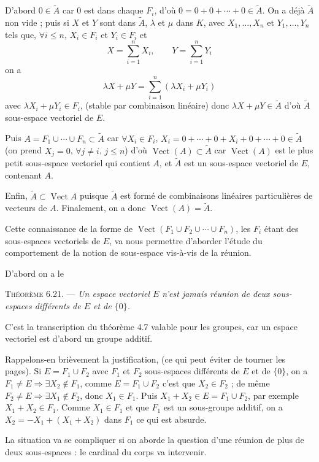 D'abord $0\in\widetilde A$ car 0 est dans chaque $F_i$, d'où $0=0+0+\cdots+0\in\widetilde A$. On a déjà $\widetilde A$ non vide ; puis si $X$ et $Y$ sont dans $\widetilde A$, $\lambda$ et $\mu$ dans $K$, avec $X_1,\ldots,X_n$ et $Y_1,\ldots,Y_n$ tels que, $\forall i\le n$, $X_i\in F_i$ et $Y_i\in F_i$ et
\[
X=\sum_{i=1}^nX_i,\qquad Y=\sum_{i=1}^nY_i
\]
on a
\[
\lambda X+\mu Y=\sum_{i=1}^n(\lambda X_i+\mu Y_i)
\]
avec $\lambda X_i+\mu Y_i\in F_i$, (stable par combinaison linéaire) donc $\lambda X+\mu Y\in\widetilde A$ d'où $\widetilde A$ sous-espace vectoriel de $E$.

Puis $A=F_1\cup\cdots\cup F_n\subset\widetilde A$ car $\forall X_i\in F_i$, $X_i=0+\cdots+0+X_i+0+\cdots+0\in\widetilde A$ (on prend $X_j=0$, $\forall j\ne i$, $j\le n$) d'où $\operatorname{Vect}(A)\subset\widetilde A$ car $\operatorname{Vect}(A)$ est le plus petit sous-espace vectoriel qui contient $A$, et $\widetilde A$ est un sous-espace vectoriel de $E$, contenant $A$.

Enfin, $\widetilde A\subset\operatorname{Vect}A$ puisque $\widetilde A$ est formé de combinaisons linéaires particulières de vecteurs de $A$. Finalement, on a donc $\operatorname{Vect}(A)=\widetilde A$. \bookend

Cette connaissance de la forme de $\operatorname{Vect}(F_1\cup F_2\cup\cdots\cup F_n)$, les $F_i$ étant des sous-espaces vectoriels de $E$, va nous permettre d'aborder l'étude du comportement de la notion de sous-espace vis-à-vis de la réunion.

D'abord on a le

\medskip\noindent\textsc{Théorème 6.21.} --- \emph{Un espace vectoriel $E$ n'est jamais réunion de deux sous-espaces différents de $E$ et de $\{0\}$.}

C'est la transcription du théorème 4.7 valable pour les groupes, car un espace vectoriel est d'abord un groupe additif.

Rappelons-en brièvement la justification, (ce qui peut éviter de tourner les pages). Si $E=F_1\cup F_2$ avec $F_1$ et $F_2$ sous-espaces différents de $E$ et de $\{0\}$, on a $F_1\ne E\Rightarrow\exists X_2\notin F_1$, comme $E=F_1\cup F_2$ c'est que $X_2\in F_2$ ; de même $F_2\ne E\Rightarrow\exists X_1\notin F_2$, donc $X_1\in F_1$. Puis $X_1+X_2\in E=F_1\cup F_2$, par exemple $X_1+X_2\in F_1$. Comme $X_1\in F_1$ et que $F_1$ est un sous-groupe additif, on a $X_2=-X_1+(X_1+X_2)$ dans $F_1$ ce qui est absurde. \bookend

La situation va se compliquer si on aborde la question d'une réunion de plus de deux sous-espaces : le cardinal du corps va intervenir.

